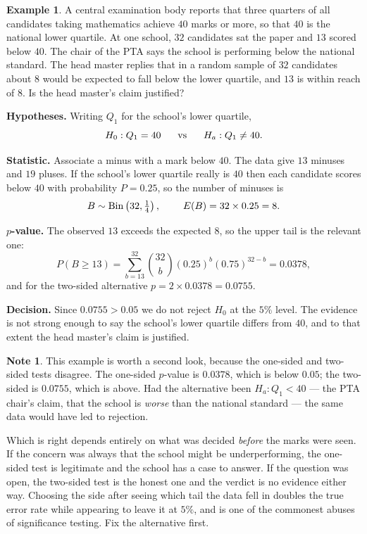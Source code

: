 \documentclass[11pt,a4paper]{article}
\theoremstyle{definition}
\newtheorem{example}[thm]{Example}
\newtheorem{note}[thm]{Note}
\begin{document}
\begin{example}
A central examination body reports that three quarters of all candidates taking
mathematics achieve $40$ marks or more, so that $40$ is the national lower
quartile. At one school, $32$ candidates sat the paper and $13$ scored below $40$.
The chair of the PTA says the school is performing below the national standard.
The head master replies that in a random sample of $32$ candidates about $8$ would
be expected to fall below the lower quartile, and $13$ is within reach of $8$. Is
the head master's claim justified?

\textbf{Hypotheses.} Writing $Q_1$ for the school's lower quartile,
$$H_0:Q_1=40\hspace{0.6cm}\text{vs}\hspace{0.6cm}H_a:Q_1\neq 40 .$$

\textbf{Statistic.} Associate a minus with a mark below $40$. The data give $13$
minuses and $19$ pluses. If the school's lower quartile really is $40$ then each
candidate scores below $40$ with probability $P=0.25$, so the number of minuses is
$$B\sim \operatorname{Bin}\left(32,\tfrac{1}{4}\right),\hspace{0.8cm}E(B)=32\times 0.25=8 .$$

\textbf{$p$-value.} The observed $13$ exceeds the expected $8$, so the upper tail
is the relevant one:
$$P(B\geq 13)=\sum^{32}_{b=13}\binom{32}{b}(0.25)^{b}(0.75)^{32-b}=0.0378 ,$$
and for the two-sided alternative $p=2\times 0.0378=0.0755$.

\textbf{Decision.} Since $0.0755>0.05$ we do not reject $H_0$ at the $5\%$ level.
The evidence is not strong enough to say the school's lower quartile differs from
$40$, and to that extent the head master's claim is justified.
\end{example}

\begin{note}
This example is worth a second look, because the one-sided and two-sided tests
disagree. The one-sided $p$-value is $0.0378$, which is below $0.05$; the
two-sided is $0.0755$, which is above. Had the alternative been
$H_a:Q_1<40$ --- the PTA chair's claim, that the school is \emph{worse} than the
national standard --- the same data would have led to rejection.

Which is right depends entirely on what was decided \emph{before} the marks were
seen. If the concern was always that the school might be underperforming, the
one-sided test is legitimate and the school has a case to answer. If the question
was open, the two-sided test is the honest one and the verdict is no evidence
either way. Choosing the side after seeing which tail the data fell in doubles the
true error rate while appearing to leave it at $5\%$, and is one of the commonest
abuses of significance testing. Fix the alternative first.
\end{note}
\end{document}

